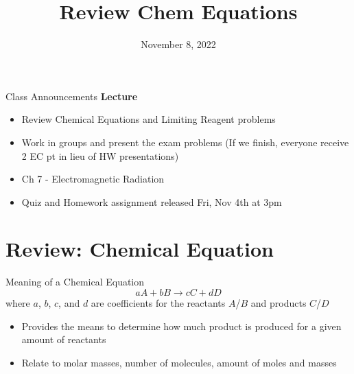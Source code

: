 \documentclass[11pt]{beamer}
\title{Review Chem Equations}
\institute{Chemistry Department, Cypress College}
\date{November 8, 2022}
\begin{document}
\begin{frame}
  \titlepage
\end{frame}

\begin{frame}{Class Announcements}
  \textbf{Lecture}
  \begin{itemize}
  \item Review Chemical Equations and Limiting Reagent problems
  \item Work in groups and present the exam problems
    (If we finish, everyone receive 2 EC pt in lieu of HW presentations)
  \item Ch 7 - Electromagnetic Radiation
  \item Quiz and Homework assignment released Fri, Nov 4th at 3pm
  \end{itemize}
\end{frame}

\section{Review: Chemical Equation}

\begin{frame}{Meaning of a Chemical Equation}
  \begin{equation}
    aA + bB \rightarrow cC + dD
  \end{equation}
  where $a$, $b$, $c$, and $d$ are coefficients for the reactants $A$/$B$
  and products $C$/$D$
  
  \begin{itemize}
  \item Provides the means to determine how much product is
    produced for a given amount of reactants
  \item Relate to molar masses, number of molecules, amount
    of moles and masses
  \end{itemize}    
\end{frame}
\end{document}
